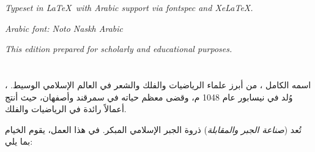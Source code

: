 \documentclass[11pt,a4paper]{book}
\begin{document}
\thispagestyle{empty}
\vspace*{8cm}
\begin{center}
{\small{}}

\vspace{0.3cm}

{\small{}}

\vspace{0.5cm}

{\small{}}

{\small{}}

\vspace{1cm}

{\footnotesize\textit{Typeset in \LaTeX\ with Arabic support via fontspec and XeLaTeX.}}

{\footnotesize\textit{Arabic font: Noto Naskh Arabic}}

\vspace{0.5cm}

{\footnotesize\textit{This edition prepared for scholarly and educational purposes.}}

\end{center}
\clearpage

\tableofcontents
\clearpage

\section{}

، اسمه الكامل ، من أبرز علماء الرياضيات والفلك والشعر في العالم الإسلامي الوسيط. وُلد في نيسابور عام 1048 م، وقضى معظم حياته في سمرقند وأصفهان، حيث أنتج أعمالاً رائدة في الرياضيات والفلك.

تُعد \textbf{} (\textit{صناعة الجبر والمقابلة}) ذروة الجبر الإسلامي المبكر. في هذا العمل، يقوم الخيام بما يلي:
\end{document}
